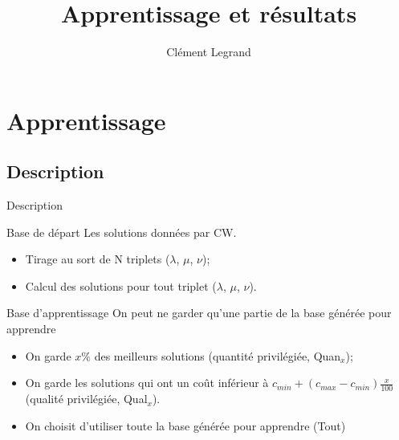 \documentclass{beamer}
\title{Apprentissage et résultats}
\author{Clément Legrand}
\begin{document}
\begin{frame}[plain]
\titlepage
\end{frame}

\section{Apprentissage}

\subsection{Description}

\begin{frame}{Description}
\begin{block}{Base de départ}
Les solutions données par CW.
\begin{itemize}
\item Tirage au sort de N triplets ($\lambda$, $\mu$, $\nu$);
\item Calcul des solutions pour tout triplet ($\lambda$, $\mu$, $\nu$).
\end{itemize}
\end{block}

\begin{block}{Base d'apprentissage}
On peut ne garder qu'une partie de la base générée pour apprendre
\begin{itemize}
\item On garde $x\%$ des meilleurs solutions (quantité privilégiée, Quan$_{x}$);
\item On garde les solutions qui ont un coût inférieur à $c_{min} + (c_{max}-c_{min})\frac{x}{100}$ (qualité privilégiée, Qual$_{x}$).
\item On choisit d'utiliser toute la base générée pour apprendre (Tout)
\end{itemize}
\end{block}
\end{frame}
\end{document}
